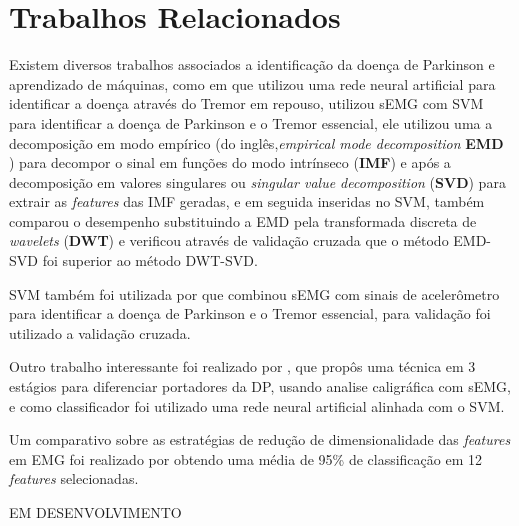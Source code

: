 \chapter[TrabalhosRelacionados]{Trabalhos Relacionados}

Existem diversos trabalhos associados a identificação da doença de Parkinson e aprendizado de máquinas, como em \cite{camara2015resting} que utilizou uma rede neural artificial para identificar a doença através do Tremor em repouso,  utilizou sEMG com SVM para identificar a doença de Parkinson e o Tremor essencial, ele utilizou uma a decomposição em modo empírico (do inglês,\textit{empirical mode decomposition} \textbf{EMD} ) para decompor o sinal em funções do modo intrínseco (\textbf{IMF}) e após a decomposição em valores singulares ou \textit{singular value decomposition} (\textbf{SVD}) para extrair as \textit{features} das IMF geradas, e em seguida inseridas no SVM,  também comparou o desempenho substituindo a EMD pela transformada discreta de \textit{wavelets} (\textbf{DWT})  e verificou através de validação cruzada que o método EMD-SVD foi superior ao método DWT-SVD.

SVM também foi utilizada por \cite{kugler2013automated} que combinou sEMG com sinais de acelerômetro para identificar a doença de Parkinson e o Tremor essencial, para validação foi utilizado a validação cruzada.

Outro trabalho interessante foi realizado por \cite{loconsole2018model}, que propôs uma técnica em 3 estágios para diferenciar portadores da DP, usando analise caligráfica com sEMG, e como classificador foi utilizado uma rede neural artificial alinhada com o SVM.

Um comparativo sobre as estratégias de redução de dimensionalidade das \textit{features} em EMG foi realizado por \cite{liu2014feature} obtendo uma média de 95\% de classificação em 12 \textit{features} selecionadas. 

EM DESENVOLVIMENTO
